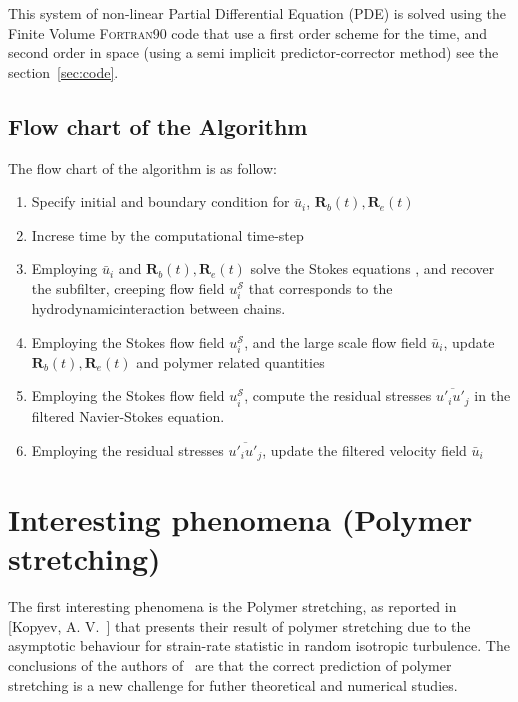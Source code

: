 This system of non-linear Partial Differential Equation (PDE) is solved using the Finite Volume \textsc{Fortran90} code that use a first order scheme for the time, and second order in space (using a semi implicit predictor-corrector method) see the section~\ref{sec:code}. 

\subsection{Flow chart of the Algorithm}
The flow chart of the algorithm is as follow:
\begin{enumerate}
\item Specify initial and boundary condition for $\bar{u}_i$, $\mathbf{R}_b (t), \mathbf{R}_e (t) $
\item Increse time by the computational time-step
\item Employing $\bar{u}_i$ and $\mathbf{R}_b (t), \mathbf{R}_e (t)$ solve the Stokes equations , and recover the subfilter, creeping flow field $u_i^{\mathcal{S}}$ that corresponds to the hydrodynamicinteraction between chains.
\item Employing the Stokes flow field $u_i^{\mathcal{S}}$, and the large scale flow field $\bar{u}_i$, update  $\mathbf{R}_b (t), \mathbf{R}_e (t) $ and polymer related quantities
\item Employing the Stokes flow field $u_i^{\mathcal{S}}$, compute the residual stresses $\overline{u'_i u'_j}$ in the filtered Navier-Stokes equation.
\item Employing the residual stresses $\overline{u'_i u'_j}$, update 
the filtered velocity field $\bar{u}_i$
\end{enumerate}

\section{Interesting phenomena (Polymer stretching)}


The first interesting phenomena is the Polymer stretching, as reported in [Kopyev, A. V.~\cite{str}] that presents their result of polymer stretching due to the asymptotic behaviour for strain-rate statistic in random isotropic turbulence. 
The conclusions of the authors of~\cite{str} are that the correct prediction of polymer stretching is a new challenge for futher theoretical and numerical studies. 

